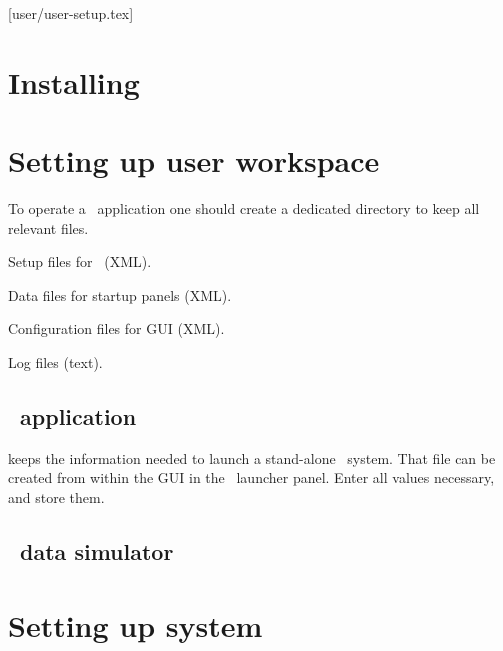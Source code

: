 [user/user-setup.tex]
\section{Installing \dabc}
\section{Setting up user workspace}
To operate a \dabc\ application one should create a dedicated directory
to keep all relevant files.
\bbul
\item Setup files for \dabc\ (XML).
\item Data files for startup panels (XML).
\item Configuration files for GUI (XML).
\item Log files (text).
\ebul
\subsection{\mbs\ application}
 keeps the information needed to launch a stand-alone \mbs\ system.
That file can be created from within the GUI in the \mbs\ launcher panel.
Enter all values necessary, and store them. 
\subsection{\dabc\ data simulator}
\section{Setting up system}
